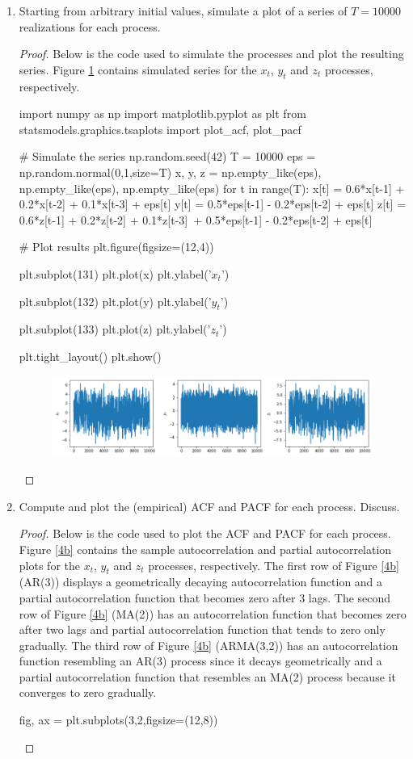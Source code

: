 \documentclass[oneside,reqno]{amsart}
\theoremstyle{definition}
\begin{document}
\begin{enumerate}
\item
Starting from arbitrary initial values, simulate a plot of a series of $T=10000$ realizations for each process. 
\begin{proof}
Below is the code used to simulate the processes and plot the resulting series. Figure \ref{4a} contains simulated series for the $x_t$, $y_t$ and $z_t$ processes, respectively.
\begin{python3code}
import numpy as np
import matplotlib.pyplot as plt
from statsmodels.graphics.tsaplots import plot_acf, plot_pacf

# Simulate the series
np.random.seed(42)
T = 10000
eps = np.random.normal(0,1,size=T)
x, y, z = np.empty_like(eps), np.empty_like(eps), np.empty_like(eps) 
for t in range(T):
    x[t] = 0.6*x[t-1] + 0.2*x[t-2] + 0.1*x[t-3] + eps[t]
    y[t] = 0.5*eps[t-1] - 0.2*eps[t-2] + eps[t]
    z[t] = 0.6*z[t-1] + 0.2*z[t-2] + 0.1*z[t-3]\
           + 0.5*eps[t-1] - 0.2*eps[t-2] + eps[t]

# Plot results           
plt.figure(figsize=(12,4))

plt.subplot(131)
plt.plot(x)
plt.ylabel('$x_t$')

plt.subplot(132)
plt.plot(y)
plt.ylabel('$y_t$')

plt.subplot(133)
plt.plot(z)
plt.ylabel('$z_t$')

plt.tight_layout()
plt.show()         
\end{python3code}
 
\begin{figure}
\includegraphics[width=\textwidth]{q4-a}
\caption{}
\label{4a}
\end{figure}
\end{proof}

\item
Compute and plot the (empirical) ACF and PACF for each process. Discuss.
\begin{proof}
Below is the code used to plot the ACF and PACF for each process. Figure \ref{4b} contains the sample autocorrelation and partial autocorrelation plots for the $x_t$, $y_t$ and $z_t$ processes, respectively. The first row of Figure \ref{4b} (AR(3)) displays a geometrically decaying autocorrelation function and a partial autocorrelation function that becomes zero after 3 lags. The second row of Figure \ref{4b} (MA(2)) has an autocorrelation function that becomes zero after two lags and partial autocorrelation function that tends to zero only gradually. The third row of Figure \ref{4b} (ARMA(3,2)) has an autocorrelation function resembling an AR(3) process since it decays geometrically and a partial autocorrelation function that resembles an MA(2) process because it converges to zero gradually. 
\begin{python3code}
fig, ax = plt.subplots(3,2,figsize=(12,8))
 

\end{python3code}
\end{proof}
\end{enumerate}
\end{document}
